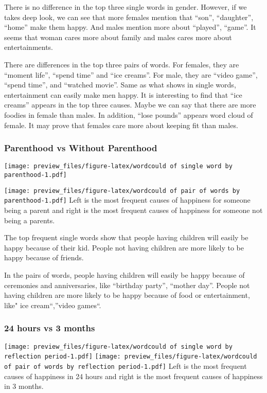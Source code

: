 \documentclass[]{article}
\begin{document}
There is no difference in the top three single words in gender. However,
if we takes deep look, we can see that more females mention that
``son'', ``daughter'', ``home'' make them happy. And males mention more
about ``played'', ``game''. It seems that woman cares more about family
and males cares more about entertainments.

There are differences in the top three pairs of words. For females, they
are ``moment life'', ``spend time'' and ``ice creams''. For male, they
are ``video game'', ``spend time'', and ``watched movie''. Same as what
shows in single words, entertainment can easily make men happy. It is
interesting to find that ``ice creams'' appears in the top three causes.
Maybe we can say that there are more foodies in female than males. In
addition, ``lose pounds'' appears word cloud of female. It may prove
that females care more about keeping fit than males.

\subsubsection{Parenthood vs Without
Parenthood}\label{parenthood-vs-without-parenthood}

\texttt{[image: preview\_files/figure-latex/wordcould of single word by parenthood-1.pdf]}

\texttt{[image: preview\_files/figure-latex/wordcould of pair of words by parenthood-1.pdf]}
Left is the most frequent causes of happiness for someone being a parent
and right is the most frequent causes of happiness for someone not being
a parents.

The top frequent single words show that people having children will
easily be happy because of their kid. People not having children are
more likely to be happy because of friends.

In the pairs of words, people having children will easily be happy
because of ceremonies and anniversaries, like ``birthday party'',
``mother day''. People not having children are more likely to be happy
because of food or entertainment, like" ice cream``,''video games``.

\subsubsection{24 hours vs 3 months}\label{hours-vs-3-months}

\texttt{[image: preview\_files/figure-latex/wordcould of single word by reflection period-1.pdf]}
\texttt{[image: preview\_files/figure-latex/wordcould of pair of words by reflection period-1.pdf]}
Left is the most frequent causes of happiness in 24 hours and right is
the most frequent causes of happiness in 3 months.
\end{document}
